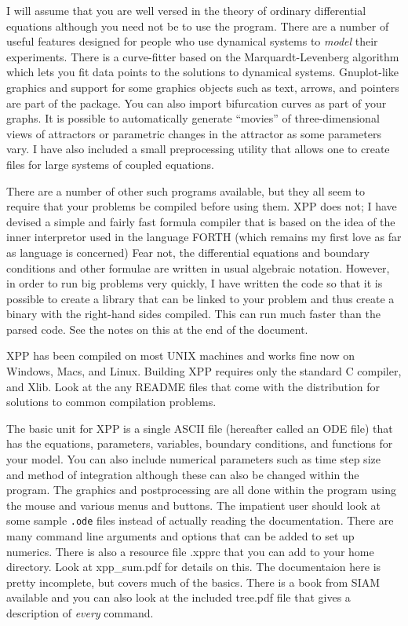 \documentclass{article}
\begin{document}
 
I will assume that you are well versed in the theory of ordinary differential
 equations although you need not be to use the program.  
There are a number of useful features designed for people who use
dynamical systems to {\em model} their experiments.  There is a
curve-fitter based on the Marquardt-Levenberg algorithm which lets you
fit data points to the solutions to dynamical systems.  
Gnuplot-like graphics and
support for some graphics objects such as text, arrows, and
pointers are part of the package. You can also import bifurcation
curves as part of your graphs.
 It is possible to automatically generate ``movies'' of
three-dimensional views of attractors or parametric changes in the
attractor as some parameters vary.    I have
also included a small preprocessing utility that allows one to create
files for large systems of coupled equations. 

There are a number of other such programs available, but they all seem to
 require that your problems be compiled before using them.  XPP does not;
 I have devised a simple and fairly fast formula compiler that is based
 on the idea of the inner interpretor used in the language FORTH (which
 remains my first love as far as language is concerned)  Fear not, the
 differential equations and boundary conditions and other formulae are
 written in usual algebraic notation.  However, in order to run big
problems very quickly, I have written the code so that it is possible
to create a library that can be linked to your problem and thus create
a binary with the right-hand sides compiled.  This can run much faster
than the parsed code.  See the notes on this at the end of the
document. 



XPP has been compiled on most UNIX machines and works fine now on Windows, Macs, and Linux.
Building XPP requires only the standard C compiler,
 and Xlib.  Look at the any README files that come with the
distribution for solutions to common compilation problems.



The basic unit for XPP is a single ASCII file (hereafter called an ODE
file) that has the equations, parameters,
 variables, boundary conditions, and functions for your model. You can
also include numerical parameters such as time step size and method of
integration although these can also be changed within the program.
The graphics and postprocessing are all done within
 the program using the mouse and various menus and buttons.  The impatient
 user should look at some sample {\tt *.ode} files instead of actually reading 
the documentation.  There are many command line arguments and options that can be added to set up numerics. There is also a resource file .xpprc that you can add to your home directory.  Look at xpp\_sum.pdf for details on this.  The documentaion here is pretty incomplete, but covers much of the basics. There is a book from SIAM available and you can also look at the included tree.pdf file that gives a description of {\em every} command.
\end{document}
